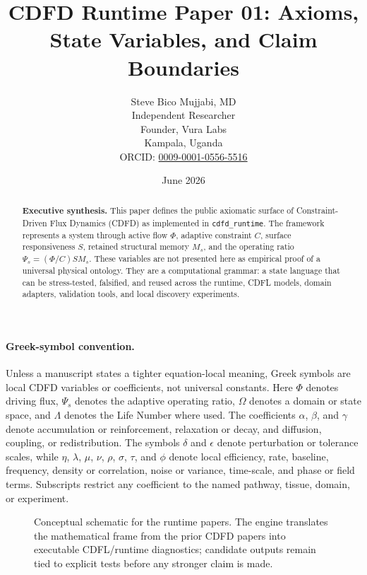 \documentclass[12pt,a4paper]{article}
\title{\textbf{CDFD Runtime Paper 01: Axioms, State Variables, and Claim Boundaries}}
\author{Steve Bico Mujjabi, MD\\
\small Independent Researcher\\
\small Founder, Vura Labs\\
\small Kampala, Uganda\\
\small ORCID: \href{https://orcid.org/0009-0001-0556-5516}{0009-0001-0556-5516}}
\date{June 2026}
\begin{document}
\maketitle

\begin{abstract}
\noindent \textbf{Executive synthesis.} This paper defines the public axiomatic
surface of Constraint-Driven Flux Dynamics (CDFD) as implemented in
\texttt{cdfd\_runtime}. The framework represents a system through active flow
$\Phi$, adaptive constraint $C$, surface responsiveness $S$, retained structural
memory $M_s$, and the operating ratio
$\Psi_s=(\Phi/C)S M_s$. These variables are not presented here as empirical
proof of a universal physical ontology. They are a computational grammar: a
state language that can be stress-tested, falsified, and reused across the
runtime, CDFL models, domain adapters, validation tools, and local discovery
experiments.
\end{abstract}

\paragraph{Greek-symbol convention.}
Unless a manuscript states a tighter equation-local meaning, Greek symbols are local CDFD variables or coefficients, not universal constants. Here $\Phi$ denotes driving flux, $\Psi_s$ denotes the adaptive operating ratio, $\Omega$ denotes a domain or state space, and $\Lambda$ denotes the Life Number where used. The coefficients $\alpha$, $\beta$, and $\gamma$ denote accumulation or reinforcement, relaxation or decay, and diffusion, coupling, or redistribution. The symbols $\delta$ and $\epsilon$ denote perturbation or tolerance scales, while $\eta$, $\lambda$, $\mu$, $\nu$, $\rho$, $\sigma$, $\tau$, and $\phi$ denote local efficiency, rate, baseline, frequency, density or correlation, noise or variance, time-scale, and phase or field terms. Subscripts restrict any coefficient to the named pathway, tissue, domain, or experiment.


\begin{figure}[ht]
\centering
{}
\caption{Conceptual schematic for the runtime papers. The engine translates the mathematical frame from the prior CDFD papers into executable CDFL/runtime diagnostics; candidate outputs remain tied to explicit tests before any stronger claim is made.}
\end{figure}
\end{document}
